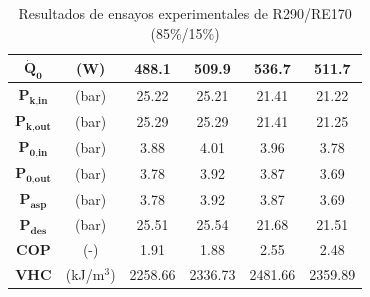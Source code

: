 \documentclass[../main.tex]{subfiles}
\begin{document}
\begin{table}[ht]
\begin{tabular}{cc|c|c|c|c|}
\hline
\multicolumn{1}{|c}{$\dot{\textbf{Q}}_\textbf{0}$} & (W) & 488.1 & 509.9 & 536.7 & 511.7 \\
\hline
\multicolumn{1}{|c}{$\textbf{P}_\textbf{k,in}$} & (bar) & 25.22 & 25.21 & 21.41 & 21.22 \\
\hline
\multicolumn{1}{|c}{$\textbf{P}_\textbf{k,out}$} & (bar) & 25.29 & 25.29 & 21.41 & 21.25 \\
\hline
\multicolumn{1}{|c}{$\textbf{P}_\textbf{0,in}$} & (bar) & 3.88 & 4.01 & 3.96 & 3.78 \\
\hline
\multicolumn{1}{|c}{$\textbf{P}_\textbf{0,out}$} & (bar) & 3.78 & 3.92 & 3.87 & 3.69 \\
\hline
\multicolumn{1}{|c}{$\textbf{P}_\textbf{asp}$} & (bar) & 3.78 & 3.92 & 3.87 & 3.69 \\
\hline
\multicolumn{1}{|c}{$\textbf{P}_\textbf{des}$} & (bar) & 25.51 & 25.54 & 21.68 & 21.51 \\
\hline
\multicolumn{1}{|c}{$\textbf{COP}$} & (-) & 1.91 & 1.88 & 2.55 & 2.48 \\
\hline
\multicolumn{1}{|c}{$\textbf{VHC}$} & (kJ/m$^3$) & 2258.66 & 2336.73 & 2481.66 & 2359.89 \\
\hline
\end{tabular}
\caption{\centering Resultados de ensayos experimentales de R290/RE170 (85\%/15\%)}
\label{tab:R290_RE170_85_15_anexo}
\end{table}
\end{document}
